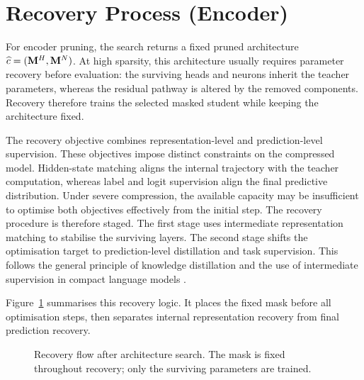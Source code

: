 \section{Recovery Process (Encoder)}
\label{chap:recovery}

For encoder pruning, the search returns a fixed pruned architecture $\widehat{c}=(\mathbf{M}^{H},\mathbf{M}^{N})$. At high sparsity, this architecture usually requires parameter recovery before evaluation: the surviving heads and neurons inherit the teacher parameters, whereas the residual pathway is altered by the removed components. Recovery therefore trains the selected masked student while keeping the architecture fixed.

The recovery objective combines representation-level and prediction-level supervision. These objectives impose distinct constraints on the compressed model. Hidden-state matching aligns the internal trajectory with the teacher computation, whereas label and logit supervision align the final predictive distribution. Under severe compression, the available capacity may be insufficient to optimise both objectives effectively from the initial step. The recovery procedure is therefore staged. The first stage uses intermediate representation matching to stabilise the surviving layers. The second stage shifts the optimisation target to prediction-level distillation and task supervision. This follows the general principle of knowledge distillation \citep{hinton2015distilling} and the use of intermediate supervision in compact language models \citep{jiao2020tinybert}.

Figure~\ref{fig:recovery_flow} summarises this recovery logic. It places the fixed mask before all optimisation steps, then separates internal representation recovery from final prediction recovery.

\begin{figure}[H]
\centering
{}
\caption{Recovery flow after architecture search. The mask is fixed throughout recovery; only the surviving parameters are trained.}
\label{fig:recovery_flow}
\end{figure}

